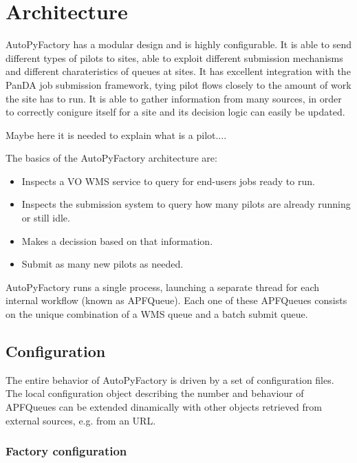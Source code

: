 \documentclass[a4paper]{jpconf}
\begin{document}
\subsection{}

\section{Architecture}


AutoPyFactory has a modular design and is highly configurable. 
It is able to send different types of pilots to sites, 
able to exploit different submission mechanisms and different charateristics of queues at sites. 
It has excellent integration with the PanDA job submission framework, 
tying pilot flows closely to the amount of work the site has to run. 
It is able to gather information from many sources, 
in order to correctly conigure itself for a site and its decision logic can easily be updated.

Maybe here it is needed to explain what is a pilot....

The basics of the AutoPyFactory architecture are:
\begin{itemize}
    \item Inspects a VO WMS service to query for end-users jobs ready to run.
    \item Inspects the submission system to query how many pilots are already running or still idle.
    \item Makes a decission based on that information.
    \item Submit as many new pilots as needed.
\end{itemize}

AutoPyFactory runs a single process,
launching a separate thread for each internal workflow (known as APFQueue).
Each one of these APFQueues consists on the unique combination of a WMS queue and a batch submit queue.

\subsection{Configuration}

The entire behavior of AutoPyFactory is driven by a set of configuration files.
The local configuration object describing the number and behaviour of APFQueues 
can be extended dinamically with other objects retrieved from external sources, 
e.g. from an URL.

\subsubsection{Factory configuration}
\end{document}
